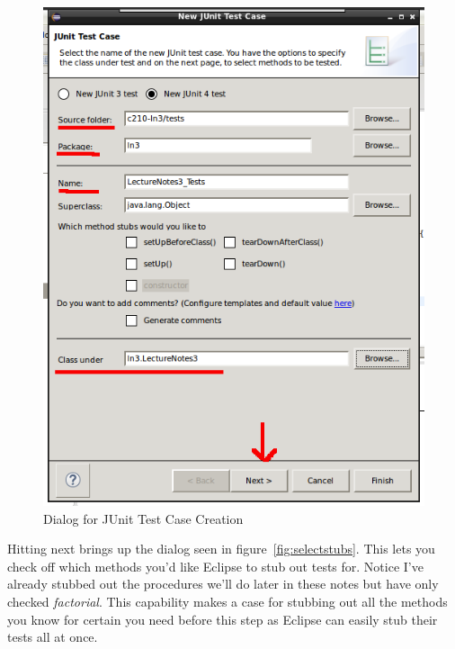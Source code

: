 \documentclass[]{tufte-handout}
\begin{document}
\vspace{.1in}
\begin{center}
\begin{figure}[!htb]
\includegraphics[scale=.5]{Eclipse-NewJUnitCase.png}
\caption{Dialog for JUnit Test Case Creation}
\label{fig:newtest}
\end{figure}
\end{center}
\vspace{.1in}

Hitting next brings up the dialog seen in figure~\ref{fig:selectstubs}. This lets you check off which methods you'd like Eclipse to stub out tests for. Notice I've already stubbed out the procedures we'll do later in these notes but have only checked \textit{factorial}. This capability makes a case for stubbing out all the methods you know for certain you need before this step as Eclipse can easily stub their tests all at once.
\end{document}

